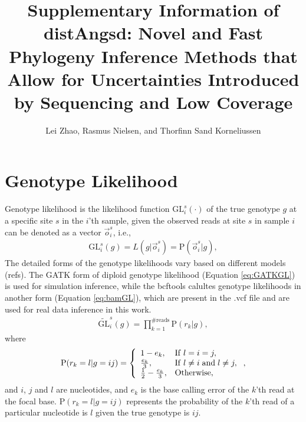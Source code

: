 \documentclass{article}
\title{Supplementary Information of distAngsd: Novel and Fast Phylogeny Inference Methods that Allow for Uncertainties Introduced by Sequencing and Low Coverage}
\author{Lei Zhao,  Rasmus Nielsen, and Thorfinn Sand Korneliussen}
\date{ }
\begin{document}
\maketitle
\section{Genotype Likelihood}\label{sec:GL}
Genotype likelihood is the likelihood function $\mathrm{GL}_i^s(\cdot)$ of the true genotype $g$ at a specific site $s$ in the $i$'th sample, given the observed reads at site $s$ in sample $i$ can be denoted as a vector $\vec{o}_i^s$, i.e.,
\begin{align*}
    \mathrm{GL}_i^s(g)=L(g|\vec{o}_i^s)=\mathrm{P}(\vec{o}_i^s|g),
\end{align*}
The detailed forms of the genotype likelihoods vary based on different models (refs). The GATK form of diploid genotype likelihood (Equation \ref{eq:GATKGL}) is used for simulation inference, while the bcftools calultes genotype likelihoods in another form (Equation \ref{eq:bamGL}), which are present in the .vcf file and are used for real data inference in this work.
\begin{align}
\widetilde{\mathrm{GL}}_i^s(g)=\prod_{k=1}^{\#\mathrm{reads}}\mathrm{P}(r_k|g),\label{eq:GATKGL}
\end{align}
where
\begin{align*}
\mathrm{P}(r_k=l|g=ij) = \left\{\begin{array}{ll}
     1-e_k, & {\rm If\hspace{0.1cm}} l=i=j,  \\
     \frac{e_k}{3}, & {\rm If\hspace{0.1cm}} l\neq i {\hspace{0.1cm}\rm and\hspace{0.1cm}} l\neq j, \\
     \frac{1}{2}-\frac{e_k}{3}, &  {\rm Otherwise,}
\end{array}\right.,
\end{align*}
 and $i$, $j$ and $l$ are nucleotides, and $e_k$ is the base calling error of the $k$'th read at the focal base. $\mathrm{P}(r_k=l|g=ij)$ represents the probability of the $k$'th read of a particular nucleotide is $l$ given the true genotype is $ij$.
\end{document}
